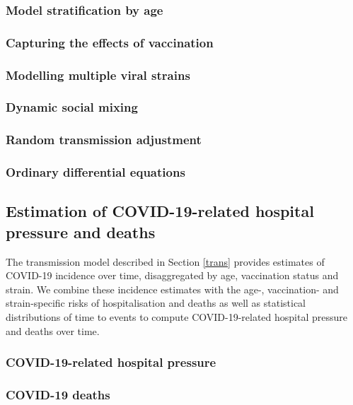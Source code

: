 \subsubsection{Model stratification by age}
\label{age}


\subsubsection{Capturing the effects of vaccination}


\subsubsection{Modelling multiple viral strains}
 


\subsubsection{Dynamic social mixing}
 

\subsubsection{Random transmission adjustment}
 

\subsubsection{Ordinary differential equations}
\label{ODEs}
 



\subsection{Estimation of COVID-19-related hospital pressure and deaths}
The transmission model described in Section \ref{trans} provides estimates of COVID-19 incidence over time, disaggregated by age, vaccination status and strain. 
We combine these incidence estimates with the age-, vaccination- and strain-specific risks of hospitalisation and deaths as well as 
statistical distributions of time to events to compute COVID-19-related hospital pressure and deaths over time.

\subsubsection{COVID-19-related hospital pressure}
\label{hosp}
 

\subsubsection{COVID-19 deaths}
 

